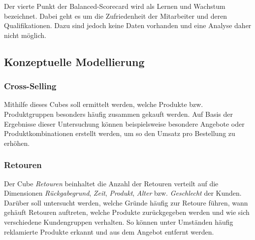 Der vierte Punkt der Balanced-Scorecard wird als Lernen und Wachstum bezeichnet. Dabei geht es um die Zufriedenheit der Mitarbeiter und deren Qualifikationen. Dazu sind jedoch keine Daten vorhanden und eine Analyse daher nicht möglich.

\pagebreak

\subsection{Konzeptuelle Modellierung}

\subsubsection*{Cross-Selling}
\begin{figure}[htbp] 
  \centering
     
\end{figure}
\vspace{10cm}
Mithilfe dieses Cubes soll ermittelt werden, welche Produkte bzw. Produktgruppen besonders häufig zusammen gekauft werden. Auf Basis der Ergebnisse dieser Untersuchung können beispielsweise besondere Angebote oder Produktkombinationen erstellt werden, um so den Umsatz pro Bestellung zu erhöhen.
\pagebreak

\subsubsection*{Retouren}
\begin{figure}[htbp] 
  \centering
     
\end{figure}
\vspace{9cm}
Der Cube \textit{Retouren} beinhaltet die Anzahl der Retouren verteilt auf die Dimensionen \textit{Rückgabegrund}, \textit{Zeit}, \textit{Produkt}, \textit{Alter} bzw.\textit{ Geschlecht} der Kunden. Darüber soll untersucht werden, welche Gründe häufig zur Retoure führen, wann gehäuft Retouren auftreten, welche Produkte zurückgegeben werden und wie sich verschiedene Kundengruppen verhalten. So können unter Umständen häufig reklamierte Produkte erkannt und aus dem Angebot entfernt werden.
\pagebreak




